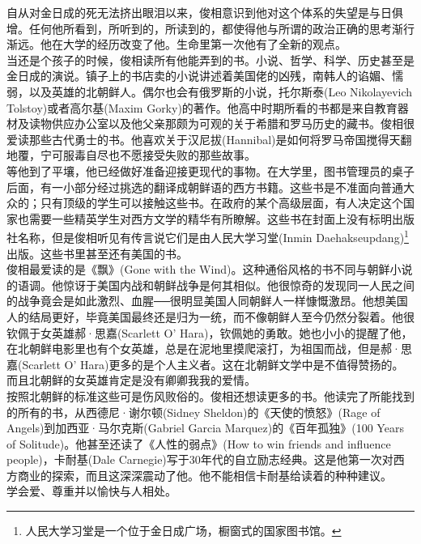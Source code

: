 自从对金日成的死无法挤出眼泪以来，俊相意识到他对这个体系的失望是与日俱增。任何他所看到，所听到的，所读到的，都使得他与所谓的政治正确的思考渐行渐远。他在大学的经历改变了他。生命里第一次他有了全新的观点。\\

当还是个孩子的时候，俊相读所有他能弄到的书。小说、哲学、科学、历史甚至是金日成的演说。镇子上的书店卖的小说讲述着美国佬的凶残，南韩人的谄媚、懦弱，以及英雄的北朝鲜人。偶尔也会有俄罗斯的小说，托尔斯泰(Leo Nikolayevich Tolstoy)或者高尔基(Maxim Gorky)的著作。他高中时期所看的书都是来自教育器材及读物供应办公室以及他父亲那颇为可观的关于希腊和罗马历史的藏书。俊相很爱读那些古代勇士的书。他喜欢关于汉尼拔(Hannibal)是如何将罗马帝国搅得天翻地覆，宁可服毒自尽也不愿接受失败的那些故事。\\

等他到了平壤，他已经做好准备迎接更现代的事物。在大学里，图书管理员的桌子后面，有一小部分经过挑选的翻译成朝鲜语的西方书籍。这些书是不准面向普通大众的；只有顶级的学生可以接触这些书。在政府的某个高级层面，有人决定这个国家也需要一些精英学生对西方文学的精华有所瞭解。这些书在封面上没有标明出版社名称，但是俊相听见有传言说它们是由人民大学习堂(Inmin Daehakseupdang)\footnote{人民大学习堂是一个位于金日成广场，橱窗式的国家图书馆。}出版。这些书里甚至还有美国的书。\\

俊相最爱读的是《飘》(Gone with the Wind)。这种通俗风格的书不同与朝鲜小说的语调。他惊讶于美国内战和朝鲜战争是何其相似。他很惊奇的发现同一人民之间的战争竟会是如此激烈、血腥──很明显美国人同朝鲜人一样慷慨激昂。他想美国人的结局更好，毕竟美国最终还是归为一统，而不像朝鲜人至今仍然分裂着。他很钦佩于女英雄郝·思嘉(Scarlett O{\EN '} Hara)，钦佩她的勇敢。她也小小的提醒了他，在北朝鲜电影里也有个女英雄，总是在泥地里摸爬滚打，为祖国而战，但是郝·思嘉(Scarlett O{\EN '} Hara)更多的是个人主义者。这在北朝鲜文学中是不值得赞扬的。而且北朝鲜的女英雄肯定是没有卿卿我我的爱情。\\

按照北朝鲜的标准这些可是伤风败俗的。俊相还想读更多的书。他读完了所能找到的所有的书，从西德尼·谢尔顿(Sidney Sheldon)的《天使的愤怒》(Rage of Angels)到加西亚·马尔克斯(Gabriel Garcia Marquez)的《百年孤独》(100 Years of Solitude)。他甚至还读了《人性的弱点》(How to win friends and influence people)，卡耐基(Dale Carnegie)写于30年代的自立励志经典。这是他第一次对西方商业的探索，而且这深深震动了他。他不能相信卡耐基给读着的种种建议。\\

学会爱、尊重并以愉快与人相处。\\

